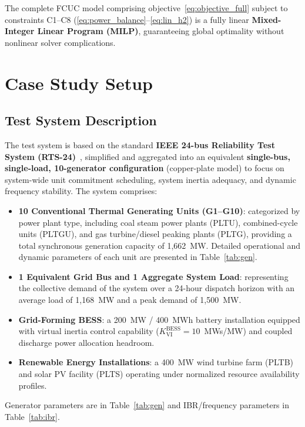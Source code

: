 \documentclass[journal]{IEEEtran}
\begin{document}
The complete FCUC model comprising objective~\eqref{eq:objective_full} subject to constraints C1--C8 (\eqref{eq:power_balance}--\eqref{eq:lin_h2}) is a fully linear \textbf{Mixed-Integer Linear Program (MILP)}, guaranteeing global optimality without nonlinear solver complications.

\section{Case Study Setup}
\label{sec:caseStudy}

\subsection{Test System Description}

The test system is based on the standard \textbf{IEEE 24-bus Reliability Test System (RTS-24)}~\cite{Kazarlis1996,E02Sulawesi}, simplified and aggregated into an equivalent \textbf{single-bus, single-load, 10-generator configuration} (copper-plate model) to focus on system-wide unit commitment scheduling, system inertia adequacy, and dynamic frequency stability. The system comprises:
\begin{itemize}
  \item \textbf{10 Conventional Thermal Generating Units (G1--G10)}: categorized by power plant type, including coal steam power plants (PLTU), combined-cycle units (PLTGU), and gas turbine/diesel peaking plants (PLTG), providing a total synchronous generation capacity of 1{,}662~MW. Detailed operational and dynamic parameters of each unit are presented in Table~\ref{tab:gen}.
  \item \textbf{1 Equivalent Grid Bus and 1 Aggregate System Load}: representing the collective demand of the system over a 24-hour dispatch horizon with an average load of 1{,}168~MW and a peak demand of 1{,}500~MW.
  \item \textbf{Grid-Forming BESS}: a 200~MW / 400~MWh battery installation equipped with virtual inertia control capability ($K_{\text{VI}}^{\text{BESS}} = 10$~MWs/MW) and coupled discharge power allocation headroom.
  \item \textbf{Renewable Energy Installations}: a 400~MW wind turbine farm (PLTB) and solar PV facility (PLTS) operating under normalized resource availability profiles.
\end{itemize}
Generator parameters are in Table~\ref{tab:gen} and IBR/frequency parameters in Table~\ref{tab:ibr}.
\end{document}
